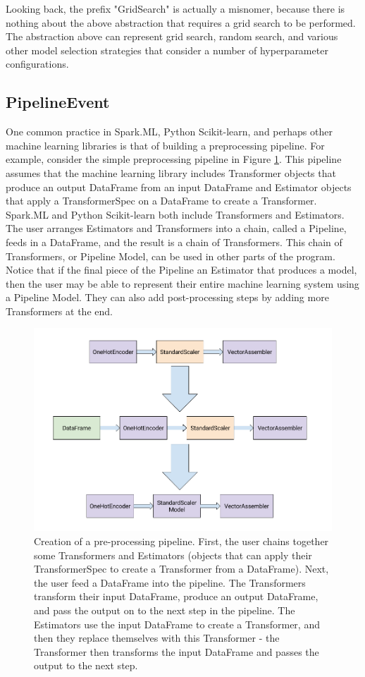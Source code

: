 Looking back, the prefix "GridSearch" is actually a misnomer, because there is nothing about the
above abstraction that requires a grid search to be performed. The abstraction above
can represent grid search, random search, and various other model selection strategies that
consider a number of hyperparameter configurations.

\subsection{PipelineEvent}
One common practice in Spark.ML, Python Scikit-learn, and perhaps other machine learning
libraries is that of building a preprocessing pipeline. For example, consider the simple
preprocessing pipeline in Figure \ref{fig:preprocessing_pipeline}. This pipeline assumes
that the machine learning library includes Transformer objects that produce an output DataFrame
from an input DataFrame and Estimator objects that apply a TransformerSpec on a DataFrame to create
a Transformer. Spark.ML and Python Scikit-learn both include Transformers and Estimators. The user
arranges Estimators and Transformers into a chain, called a Pipeline, feeds in a DataFrame, and the result is a chain
of Transformers. This chain of Transformers, or Pipeline Model, can be used in other parts of the 
program. Notice that if the final piece of the Pipeline an Estimator that produces a model, then
the user may be able to represent their entire machine learning system using a Pipeline Model. They can also
add post-processing steps by adding more Transformers at the end.

\begin{figure}
  \centering
  \includegraphics[height=3.0in]{preprocessing_pipeline}
  \caption{
    Creation of a pre-processing pipeline. First, the user chains together some
    Transformers and Estimators (objects that can apply their TransformerSpec to
    create a Transformer from a DataFrame). Next, the user feed a DataFrame into the pipeline. The
    Transformers transform their input DataFrame, produce an output DataFrame, and
    pass the output on to the next step in the pipeline. The Estimators use the input DataFrame
    to create a Transformer, and then they replace themselves with this Transformer - the
    Transformer then transforms the input DataFrame and passes the output to the next step.
  }
  \label{fig:preprocessing_pipeline}
\end{figure}

